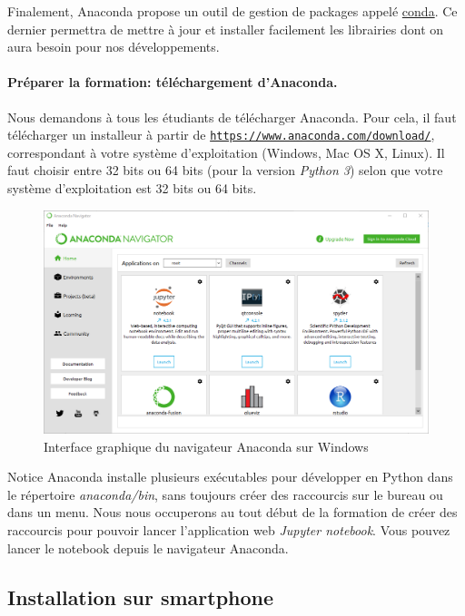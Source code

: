 \documentclass[%
oneside,                 %
final,                   %
10pt]{article}
\begin{document}
Finalement, Anaconda propose un outil de gestion de packages appelé \href{{https://conda.io/docs/}}{conda}. Ce dernier permettra de mettre à jour et installer facilement les librairies dont on aura besoin pour nos développements.

\paragraph{Préparer la formation: téléchargement d’Anaconda.}
Nous demandons à tous les étudiants de télécharger Anaconda. Pour cela, il faut télécharger un installeur à partir de \href{{https://www.anaconda.com/download/}}{\nolinkurl{https://www.anaconda.com/download/}}, correspondant à votre système d’exploitation (Windows, Mac OS X, Linux). Il faut choisir entre 32 bits ou 64 bits (pour la version \emph{Python 3}) selon que votre système d’exploitation est 32 bits ou 64 bits.


\begin{figure}[!ht]  %
  \centerline{\includegraphics[width=0.7\linewidth]{figs/AnacondaNavigator.png}}
  \caption{
  Interface graphique du navigateur Anaconda sur Windows
  }
\end{figure}


\begin{block}{Notice}
Anaconda installe plusieurs exécutables pour développer en Python dans le répertoire \emph{anaconda/bin}, sans toujours créer des raccourcis sur le bureau ou dans un menu. Nous nous occuperons au tout début de la formation de créer des raccourcis pour pouvoir lancer l'application web \emph{Jupyter notebook}. Vous pouvez lancer le notebook depuis le navigateur Anaconda.
\end{block}


\subsection{Installation sur smartphone}
\end{document}
